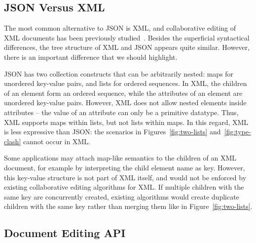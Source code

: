 \documentclass[10pt,journal,compsoc]{IEEEtran}
\begin{document}
\subsection{JSON Versus XML}\label{sec:json-xml}

The most common alternative to JSON is XML, and collaborative editing of XML documents has been previously studied~\cite{Davis:2002iv,Ignat:2003jy,Wang:2015vo}. Besides the superficial syntactical differences, the tree structure of XML and JSON appears quite similar. However, there is an important difference that we should highlight.

JSON has two collection constructs that can be arbitrarily nested: maps for unordered key-value pairs, and lists for ordered sequences. In XML, the children of an element form an ordered sequence, while the attributes of an element are unordered key-value pairs. However, XML does not allow nested elements inside attributes -- the value of an attribute can only be a primitive datatype. Thus, XML supports maps within lists, but not lists within maps. In this regard, XML is less expressive than JSON: the scenarios in Figures~\ref{fig:two-lists} and~\ref{fig:type-clash} cannot occur in XML.

Some applications may attach map-like semantics to the children of an XML document, for example by interpreting the child element name as key. However, this key-value structure is not part of XML itself, and would not be enforced by existing collaborative editing algorithms for XML. If multiple children with the same key are concurrently created, existing algorithms would create duplicate children with the same key rather than merging them like in Figure~\ref{fig:two-lists}.

\subsection{Document Editing API}\label{sec:editing-api}
\end{document}
